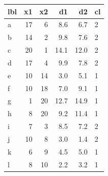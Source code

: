 \documentclass[a4paper]{article}\usepackage[]{graphicx}\usepackage[]{xcolor}
\begin{document}
\begin{minipage}[t]{0.49\textwidth}
\begin{Schunk}

\begin{tabular}{lrr>{}r>{}r>{}l}
\toprule
lbl & x1 & x2 & d1 & d2 & cl\\
\midrule
a & 17 & 6 & \textcolor{myblue}{8.6} & \textcolor{myblue}{6.7} & \textcolor{myblue}{2}\\
b & 14 & 2 & \textcolor{myblue}{9.8} & \textcolor{myblue}{7.6} & \textcolor{myblue}{2}\\
c & 20 & 1 & \textcolor{myblue}{14.1} & \textcolor{myblue}{12.0} & \textcolor{myblue}{2}\\
d & 17 & 4 & \textcolor{myblue}{9.9} & \textcolor{myblue}{7.8} & \textcolor{myblue}{2}\\
e & 10 & 14 & \textcolor{myblue}{3.0} & \textcolor{myblue}{5.1} & \textcolor{myblue}{1}\\
\addlinespace
f & 10 & 18 & \textcolor{myblue}{7.0} & \textcolor{myblue}{9.1} & \textcolor{myblue}{1}\\
g & 1 & 20 & \textcolor{myblue}{12.7} & \textcolor{myblue}{14.9} & \textcolor{myblue}{1}\\
h & 8 & 20 & \textcolor{myblue}{9.2} & \textcolor{myblue}{11.4} & \textcolor{myblue}{1}\\
i & 7 & 3 & \textcolor{myblue}{8.5} & \textcolor{myblue}{7.2} & \textcolor{myblue}{2}\\
j & 10 & 8 & \textcolor{myblue}{3.0} & \textcolor{myblue}{1.4} & \textcolor{myblue}{2}\\
\addlinespace
k & 6 & 9 & \textcolor{myblue}{4.5} & \textcolor{myblue}{5.0} & \textcolor{myblue}{1}\\
l & 8 & 10 & \textcolor{myblue}{2.2} & \textcolor{myblue}{3.2} & \textcolor{myblue}{1}\\
\bottomrule
\end{tabular}

\end{Schunk}
\end{minipage}
\hspace{0.02\textwidth}
\end{document}
